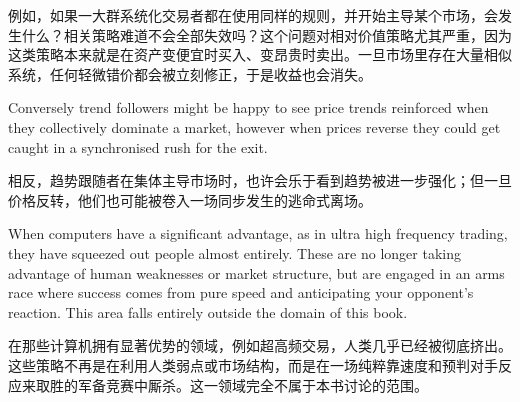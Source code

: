 \begin{chineseblock}例如，如果一大群系统化交易者都在使用同样的规则，并开始主导某个市场，会发生什么？相关策略难道不会全部失效吗？这个问题对相对价值策略尤其严重，因为这类策略本来就是在资产变便宜时买入、变昂贵时卖出。一旦市场里存在大量相似系统，任何轻微错价都会被立刻修正，于是收益也会消失。\end{chineseblock}

\bipairgap

\begin{englishblock} Conversely trend followers might be happy to see price trends reinforced when they collectively dominate a market, however when prices reverse they could get caught in a synchronised rush for the exit. \end{englishblock}

\begin{chineseblock}相反，趋势跟随者在集体主导市场时，也许会乐于看到趋势被进一步强化；但一旦价格反转，他们也可能被卷入一场同步发生的逃命式离场。\end{chineseblock}

\bipairgap

\begin{englishblock} When computers have a significant advantage, as in ultra high frequency trading, they have squeezed out people almost entirely. These are no longer taking advantage of human weaknesses or market structure, but are engaged in an arms race where success comes from pure speed and anticipating your opponent's reaction. This area falls entirely outside the domain of this book. \end{englishblock}

\begin{chineseblock}在那些计算机拥有显著优势的领域，例如超高频交易，人类几乎已经被彻底挤出。这些策略不再是在利用人类弱点或市场结构，而是在一场纯粹靠速度和预判对手反应来取胜的军备竞赛中厮杀。这一领域完全不属于本书讨论的范围。\end{chineseblock}


%


